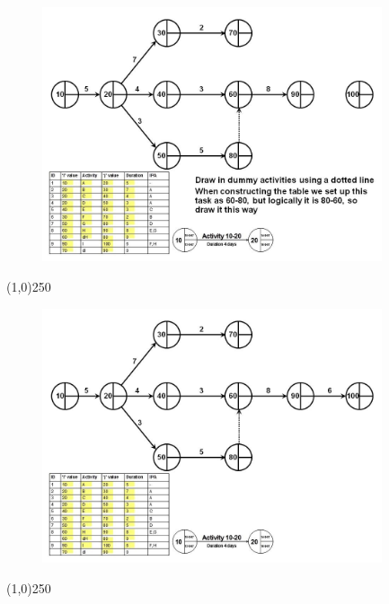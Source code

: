 \begin{frame}
\begin{figure}
	\centering
		\includegraphics[width = 10.0cm]{oldnotes/Slide99.jpg}
\end{figure}
\end{frame}
\begin{center}\line(1,0){250}\end{center}


\begin{frame}
\begin{figure}
	\centering
		\includegraphics[width = 10.0cm]{oldnotes/Slide100.jpg}
\end{figure}
\end{frame}
\begin{center}\line(1,0){250}\end{center}


